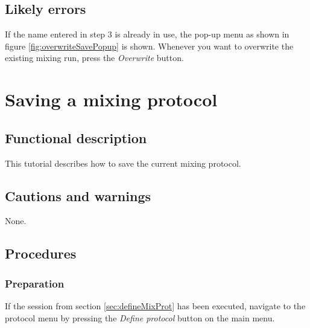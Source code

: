 \subsection{Likely errors}
If the name entered in step 3 is already in use, the pop-up menu as shown in figure \ref{fig:overwriteSavePopup} is shown. Whenever you want to overwrite the existing mixing run, press the \emph{Overwrite} button.



\section{Saving a mixing protocol}\label{sec:savmixprot}

\subsection{Functional description}
This tutorial describes how to save the current mixing protocol.

\subsection{Cautions and warnings}
None.

\subsection{Procedures}

\subsubsection{Preparation}
If the session from section \ref{sec:defineMixProt} has been executed, navigate to the protocol menu by pressing the \emph{Define protocol} button on the main menu.

